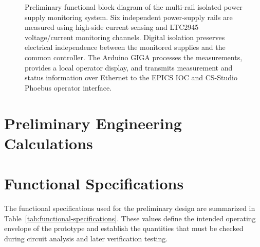 \begin{figure}[H]
{{\begin{minipage}{0.9\textheight}
{%
                }

                \vspace{0.25cm}

                \caption{
                    Preliminary functional block diagram of the multi-rail isolated
                    power supply monitoring system. Six independent power-supply rails
                    are measured using high-side current sensing and LTC2945 voltage/current
                    monitoring channels. Digital isolation preserves electrical independence
                    between the monitored supplies and the common controller. The Arduino
                    GIGA processes the measurements, provides a local operator display, and
                    transmits measurement and status information over Ethernet to the EPICS
                    IOC and CS-Studio Phoebus operator interface.
                }
                \label{fig:functional-block-diagram}

            \end{minipage}%
        }%
    }

\end{figure}

\section{Preliminary Engineering Calculations}
\label{sec:engineering-calculations}

\section{Functional Specifications}
\label{sec:functional-specifications}
The functional specifications used for the preliminary design are summarized in
Table~\ref{tab:functional-specifications}. These values define the intended
operating envelope of the prototype and establish the quantities that must be
checked during circuit analysis and later verification testing.

